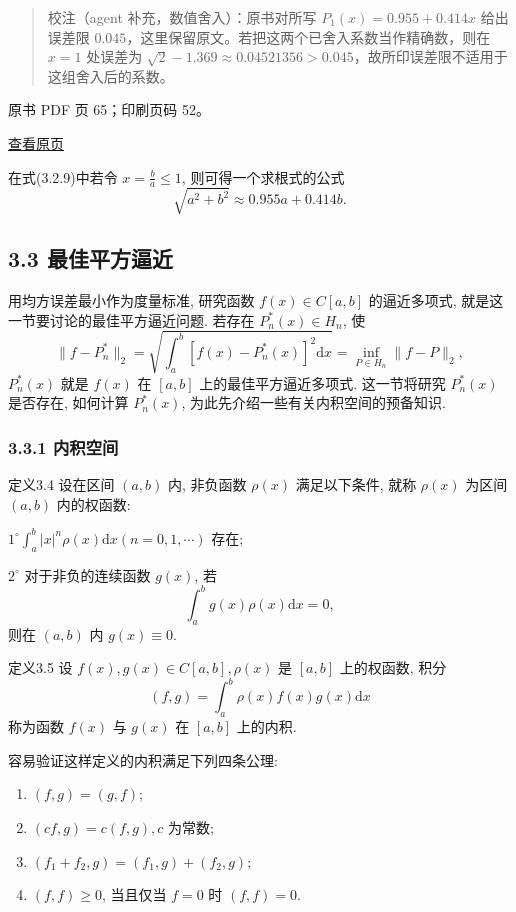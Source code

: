 \begin{quote}
校注（agent 补充，数值舍入）：原书对所写 \(P_1(x)=0.955+0.414x\) 给出误差限 \(0.045\)，这里保留原文。若把这两个已舍入系数当作精确数，则在 \(x=1\) 处误差为 \(\sqrt2-1.369\approx0.04521356>0.045\)，故所印误差限不适用于这组舍入后的系数。
\end{quote}

\clearpage

原书 PDF 页 65；印刷页码 52。

\href{source-images/pdf-065.jpeg}{查看原页}

在式(3.2.9)中若令 \(x = \frac{b}{a} \leqslant 1\), 则可得一个求根式的公式 \[
\sqrt{a^2 + b^2} \approx 0.955a + 0.414b.
\]

\subsection{3.3 最佳平方逼近}\label{ch03a-ux6700ux4f73ux5e73ux65b9ux903cux8fd1}

用均方误差最小作为度量标准, 研究函数 \(f(x) \in C[a,b]\) 的逼近多项式, 就是这一节要讨论的最佳平方逼近问题. 若存在 \(P_n^*(x) \in H_n\), 使 \[
\|f - P_n^*\|_2 = \sqrt{\int_a^b [f(x) - P_n^*(x)]^2 \mathrm{d}x} = \inf_{P \in H_n} \|f - P\|_2, \tag{3.3.1}
\] \(P_n^*(x)\) 就是 \(f(x)\) 在 \([a,b]\) 上的最佳平方逼近多项式. 这一节将研究 \(P_n^*(x)\) 是否存在, 如何计算 \(P_n^*(x)\), 为此先介绍一些有关内积空间的预备知识.

\subsubsection{3.3.1 内积空间}\label{ch03a-ux5185ux79efux7a7aux95f4}

定义3.4 设在区间 \((a,b)\) 内, 非负函数 \(\rho(x)\) 满足以下条件, 就称 \(\rho(x)\) 为区间 \((a,b)\) 内的权函数:

\(1^\circ \int_a^b |x|^n \rho(x) \mathrm{d}x (n = 0,1,\cdots)\) 存在;

\(2^\circ\) 对于非负的连续函数 \(g(x)\), 若 \[
\int_a^b g(x) \rho(x) \mathrm{d}x = 0, \tag{3.3.2}
\] 则在 \((a,b)\) 内 \(g(x) \equiv 0\).

定义3.5 设 \(f(x), g(x) \in C[a,b], \rho(x)\) 是 \([a,b]\) 上的权函数, 积分 \[
(f,g) = \int_a^b \rho(x) f(x) g(x) \mathrm{d}x \tag{3.3.3}
\] 称为函数 \(f(x)\) 与 \(g(x)\) 在 \([a,b]\) 上的内积.

容易验证这样定义的内积满足下列四条公理:

\begin{enumerate}
\def\labelenumi{(\arabic{enumi})}
\item
  \((f,g) = (g,f)\);
\item
  \((cf,g) = c(f,g), c\) 为常数;
\item
  \((f_1 + f_2, g) = (f_1, g) + (f_2, g)\);
\item
  \((f,f) \geqslant 0\), 当且仅当 \(f=0\) 时 \((f,f)=0\).
\end{enumerate}

